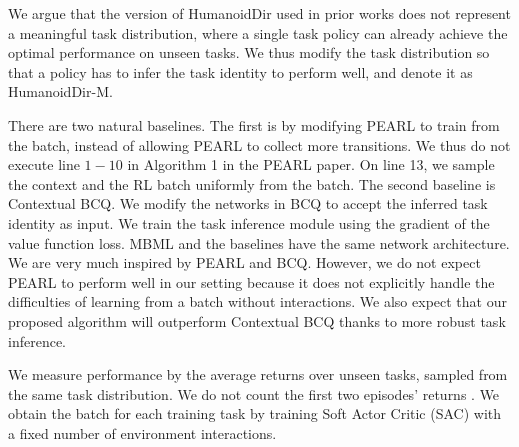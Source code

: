 We argue that the version of HumanoidDir used in prior works does not represent a meaningful task distribution, where a single task policy can already achieve the optimal performance on unseen tasks. We thus modify the task distribution so that a policy has to infer the task identity to perform well, and denote it as HumanoidDir-M. 

There are two natural baselines. The first is by modifying PEARL \cite{rakelly2019efficient} to train from the batch, instead of allowing PEARL to collect more transitions. We thus do not execute line $1-10$ in Algorithm 1 in the PEARL paper. On line 13, we sample the context and the RL batch uniformly from the batch. The second baseline is Contextual BCQ. We modify the networks in BCQ to accept the inferred task identity as input. We train the task inference module using the gradient of the value function loss. MBML and the baselines have the same network architecture. We are very much inspired by PEARL and BCQ. However, we do not expect PEARL to perform well in our setting because it does not explicitly handle the difficulties of learning from a batch without interactions. We also expect that our proposed algorithm will outperform Contextual BCQ thanks to more robust task inference.

We measure performance by the average returns over unseen tasks, sampled from the same task distribution. We do not count the first two episodes' returns \cite{rakelly2019efficient}. We obtain the batch for each training task by training Soft Actor Critic (SAC) \cite{haarnoja2018soft} with a fixed number of environment interactions. 


